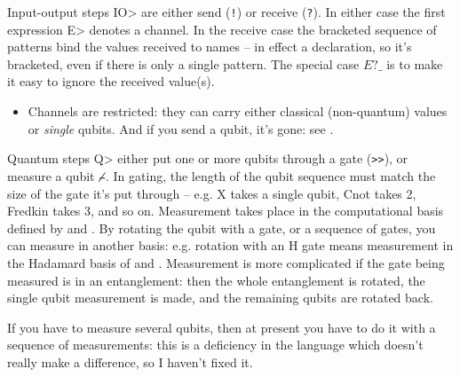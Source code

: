 \documentclass[11pt,a4paper]{article}
\newcommand{\verbtt}[1]{\texttt{\small{}#1}}
\begin{document}
Input-output steps \<IO> are either send (\verbtt{!}) or receive (\verbtt{?}). In either case the first expression \<E> denotes a channel. In the receive case the bracketed sequence of patterns bind the values received to names -- in effect a declaration, so it's bracketed, even if there is only a single pattern. The special case $E?\_$ is to make it easy to ignore the received value(s).
\begin{itemize}
\item Channels are restricted: they can carry either classical (non-quantum) values or \emph{single} qubits. And if you send a qubit, it's gone: see .
\end{itemize}

Quantum steps \<Q> either put one or more qubits through a gate (\verbtt{>>}), or measure a qubit \verbtt{⌢̸}. In gating, the length of the qubit sequence must match the size of the gate it's put through -- e.g. X takes a single qubit, Cnot takes 2, Fredkin takes 3, and so on. Measurement takes place in the computational basis defined by \zero{} and \one. By rotating the qubit with a gate, or a sequence of gates, you can measure in another basis: e.g. rotation with an H gate means measurement in the Hadamard basis of \plus and \minus. Measurement is more complicated if the gate being measured is in an entanglement: then the whole entanglement is rotated, the single qubit measurement is made, and the remaining qubits are rotated back.

If you have to measure several qubits, then at present you have to do it with a sequence of measurements: this is a deficiency in the language which doesn't really make a difference, so I haven't fixed it.
\end{document}
